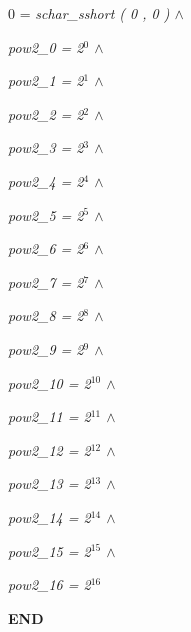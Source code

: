 \documentclass[11pt]{article}
\begin{document}
\begin{sloppypar}
\hspace*{0.20in} \hspace*{0.30in}

\hspace*{0.20in}\rm 0 \rm = \it schar\_sshort \rm ( \rm 0 \rm , \rm 0 \rm )  $\land$ 

\hspace*{0.20in}

\hspace*{0.20in} 

\hspace*{0.20in}\it pow2\_0 \rm = \rm 2$^{0}$  $\land$ 

\hspace*{0.20in}\it pow2\_1 \rm = \rm 2$^{1}$  $\land$ 

\hspace*{0.20in}\it pow2\_2 \rm = \rm 2$^{2}$  $\land$ 

\hspace*{0.20in}\it pow2\_3 \rm = \rm 2$^{3}$  $\land$ 

\hspace*{0.20in}\it pow2\_4 \rm = \rm 2$^{4}$  $\land$ 

\hspace*{0.20in}\it pow2\_5 \rm = \rm 2$^{5}$  $\land$ 

\hspace*{0.20in}\it pow2\_6 \rm = \rm 2$^{6}$  $\land$ 

\hspace*{0.20in}\it pow2\_7 \rm = \rm 2$^{7}$  $\land$ 

\hspace*{0.20in}\it pow2\_8 \rm = \rm 2$^{8}$  $\land$ 

\hspace*{0.20in}\it pow2\_9 \rm = \rm 2$^{9}$  $\land$ \hspace*{0.20in}

\hspace*{0.20in}\it pow2\_10 \rm = \rm 2$^{10}$  $\land$ 

\hspace*{0.20in}\it pow2\_11 \rm = \rm 2$^{11}$  $\land$ 

\hspace*{0.20in}\it pow2\_12 \rm = \rm 2$^{12}$  $\land$ 

\hspace*{0.20in}\it pow2\_13 \rm = \rm 2$^{13}$  $\land$ 

\hspace*{0.20in}\it pow2\_14 \rm = \rm 2$^{14}$  $\land$ 

\hspace*{0.20in}\it pow2\_15 \rm = \rm 2$^{15}$  $\land$ 

\hspace*{0.20in}\it pow2\_16 \rm = \rm 2$^{16}$ 

\hspace*{0.20in}

\hspace*{0.20in}

\hspace*{0.20in}

\hspace*{0.20in}

\bf END

\vspace*{4mm}
\newpage
\end{sloppypar}
\end{document}
